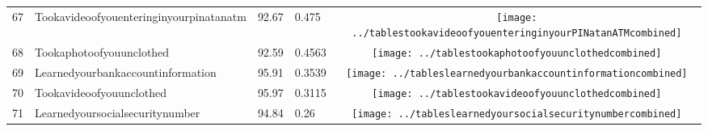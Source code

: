 \documentclass[a4paper,12pt]{article}
\begin{document}
\begin{longtable}{| p{0.5cm} | p{7cm} | p{1cm} |p{1cm} | c |}
67 & Tookavideoofyouenteringinyourpinatanatm & 92.67 & 0.475&\texttt{[image: ../tablestookavideoofyouenteringinyourPINatanATMcombined]} \\ 
68 & Tookaphotoofyouunclothed & 92.59 & 0.4563&\texttt{[image: ../tablestookaphotoofyouunclothedcombined]} \\ 
69 & Learnedyourbankaccountinformation & 95.91 & 0.3539&\texttt{[image: ../tableslearnedyourbankaccountinformationcombined]} \\ 
70 & Tookavideoofyouunclothed & 95.97 & 0.3115&\texttt{[image: ../tablestookavideoofyouunclothedcombined]} \\ 
71 & Learnedyoursocialsecuritynumber & 94.84 & 0.26&\texttt{[image: ../tableslearnedyoursocialsecuritynumbercombined]} \\ 
\end{longtable}
\end{document}
